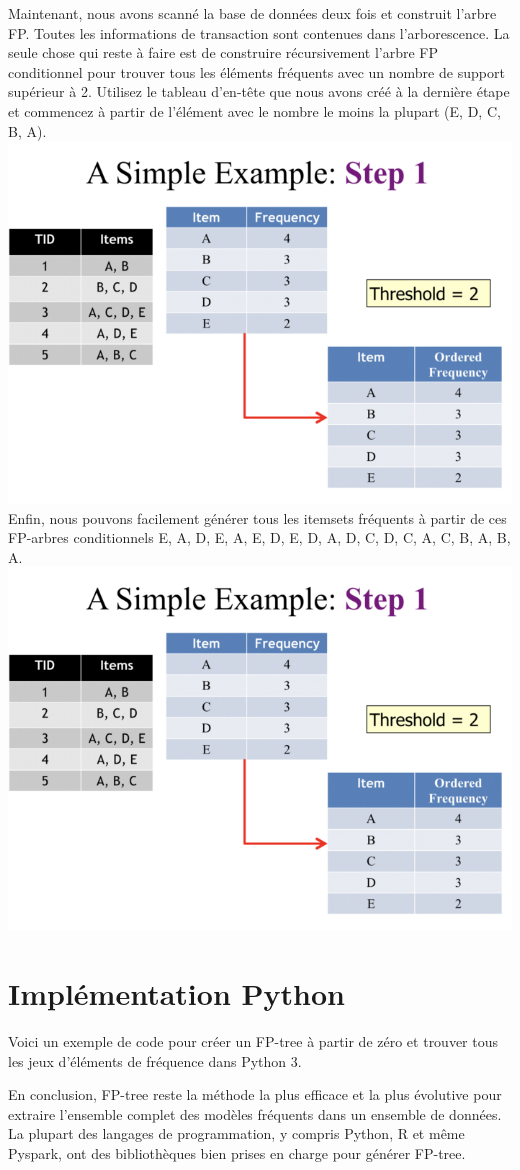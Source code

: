 \documentclass[a4paper,12pt]{article}
\begin{document}
Maintenant, nous avons scanné la base de données deux fois et construit l'arbre FP. Toutes les informations de transaction sont contenues dans l'arborescence. La seule chose qui reste à faire est de construire récursivement l'arbre FP conditionnel pour trouver tous les éléments fréquents avec un nombre de support supérieur à 2. Utilisez le tableau d'en-tête que nous avons créé à la dernière étape et commencez à partir de l'élément avec le nombre le moins la plupart (E, D, C, B, A).
\includegraphics[width=\textwidth]{one}
Enfin, nous pouvons facilement générer tous les itemsets fréquents à partir de ces FP-arbres conditionnels {E}, {A, D, E}, {A, E}, {D, E}, {D}, {A, D}, { C, D}, {C}, {A, C}, {B}, {A, B}, {A}.
\includegraphics[width=\textwidth]{one}
\section{Implémentation Python}
Voici un exemple de code pour créer un FP-tree à partir de zéro et trouver tous les jeux d'éléments de fréquence dans Python 3.

En conclusion, FP-tree reste la méthode la plus efficace et la plus évolutive pour extraire l'ensemble complet des modèles fréquents dans un ensemble de données. La plupart des langages de programmation, y compris Python, R et même Pyspark, ont des bibliothèques bien prises en charge pour générer FP-tree.
\end{document}
